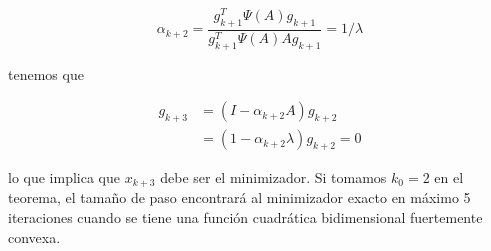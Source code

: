 \begin{equation*}
	\alpha_{k+2}= \frac{g_{k+1}^T\Psi(A)g_{k+1}}{g_{k+1}^T\Psi(A)Ag_{k+1}} = 1/\lambda
\end{equation*}

tenemos que

\begin{align*}
	g_{k+3} & = (I-\alpha_{k+2}A)g_{k+2}         \\
	        & = (1-\alpha_{k+2}\lambda)g_{k+2}=0
\end{align*}

lo que implica que $x_{k+3}$ debe ser el minimizador. Si tomamos $k_0 =2$ en el teorema, el tamaño de paso encontrará al minimizador exacto en máximo 5 iteraciones cuando se tiene una función cuadrática bidimensional fuertemente convexa.
